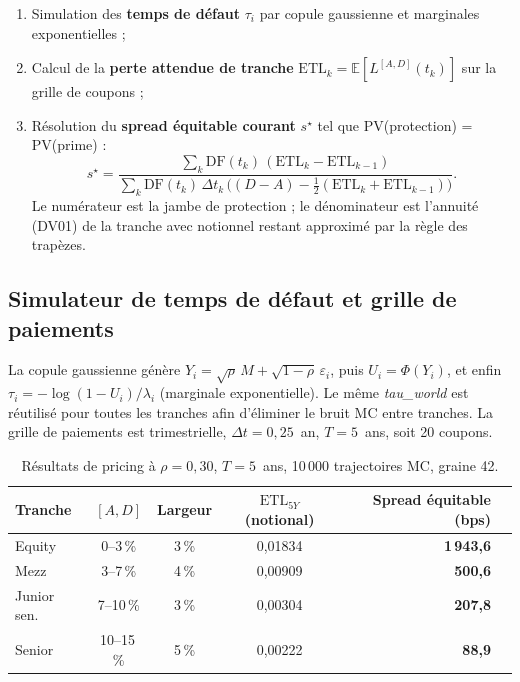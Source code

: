 \documentclass[11pt,a4paper]{article}
\newcommand{\Espe}{\mathbb{E}}
\newcommand{\ETL}{\mathrm{ETL}}
\newcommand{\DF}{\mathrm{DF}}
\begin{document}
\begin{enumerate}
\item Simulation des \textbf{temps de défaut} $\tau_i$ par copule gaussienne et
      marginales exponentielles ;
\item Calcul de la \textbf{perte attendue de tranche}
      $\ETL_k = \Espe[L^{[A,D]}(t_k)]$ sur la grille de coupons ;
\item Résolution du \textbf{spread équitable courant} $s^\star$ tel que
      PV(protection) = PV(prime) :
\begin{equation}
s^\star =
\frac{\displaystyle\sum_k \DF(t_k)\,(\ETL_k - \ETL_{k-1})}
     {\displaystyle\sum_k \DF(t_k)\,\Delta t_k\,
       \bigl((D-A) - \tfrac{1}{2}(\ETL_k + \ETL_{k-1})\bigr)}.
\label{eq:fair_spread}
\end{equation}
Le numérateur est la jambe de protection ; le dénominateur est l'annuité (DV01) de
la tranche avec notionnel restant approximé par la règle des trapèzes.
\end{enumerate}

\subsection{Simulateur de temps de défaut et grille de paiements}
La copule gaussienne génère $Y_i = \sqrt{\rho}\,M + \sqrt{1-\rho}\,\varepsilon_i$,
puis $U_i = \Phi(Y_i)$, et enfin $\tau_i = -\log(1 - U_i)/\lambda_i$ (marginale
exponentielle). Le même \emph{tau\_world} est réutilisé pour toutes les tranches
afin d'éliminer le bruit MC entre tranches. La grille de paiements est trimestrielle,
$\Delta t = 0{,}25$~an, $T = 5$~ans, soit 20 coupons.

\begin{table}[H]
\centering
\small
\begin{tabular}{lcccrr}
\toprule
\textbf{Tranche} & $[A, D]$ & \textbf{Largeur} &
\textbf{$\ETL_{5Y}$ (notional)} & \textbf{Spread équitable (bps)} \\
\midrule
Equity        & 0--3\,\%   & 3\,\% & 0,01834 & \textbf{1\,943,6} \\
Mezz          & 3--7\,\%   & 4\,\% & 0,00909 & \textbf{500,6} \\
Junior sen.   & 7--10\,\%  & 3\,\% & 0,00304 & \textbf{207,8} \\
Senior        & 10--15\,\% & 5\,\% & 0,00222 & \textbf{88,9} \\
\bottomrule
\end{tabular}
\caption{Résultats de pricing à $\rho = 0{,}30$, $T = 5$~ans, 10\,000 trajectoires
MC, graine 42.}
\label{tab:pricing}
\end{table}
\end{document}
